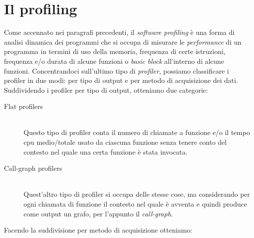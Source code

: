 \documentclass[a4paper,11pt]{report}
\begin{document}
\section{Il profiling}
Come accennato nei paragrafi precedenti, il \textit{software profiling} è una forma di analisi dinamica dei programmi che si occupa di misurare le \textit{performance} di un programma in termini di uso della memoria, frequenza di certe istruzioni, frequenza e\slash o durata di alcune funzioni o \textit{basic block} all'interno di alcune funzioni. Concentrandoci sull'ultimo tipo di \textit{profiler}, possiamo classificare i profiler in due modi: per tipo di output e per metodo di acquisizione dei dati. Suddividendo i profiler per tipo di output, otteniamo due categorie:

\begin{description}
\item[Flat profilers] \hfill \\
Questo tipo di profiler conta il numero di chiamate a funzione e/o il tempo cpu medio/totale usato da ciascuna funzione senza tenere conto del contesto nel quale una certa funzione è stata invocata.
\item[Call-graph profilers] \hfill \\
Quest'altro tipo di profiler si occupa delle stesse cose, ma considerando per ogni chiamata di funzione il contesto nel quale è avventa e quindi produce come output un grafo, per l'appunto il \textit{call-graph}.
\end{description}

\begin{flushleft}
Facendo la suddivisione per metodo di acquisizione otteniamo:
\end{flushleft}
\end{document}
